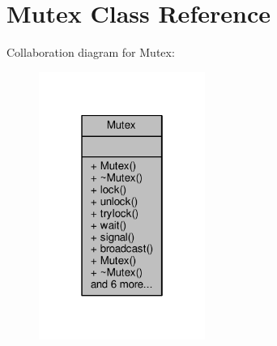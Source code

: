 \hypertarget{class_mutex}{}\section{Mutex Class Reference}
\label{class_mutex}


Collaboration diagram for Mutex\+:\nopagebreak
\begin{figure}[H]
\begin{center}
\leavevmode
\includegraphics[width=154pt]{d6/dd3/class_mutex__coll__graph}
\end{center}
\end{figure}
